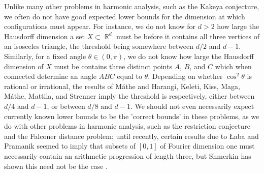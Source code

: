 \documentclass[11pt]{article}
\DeclareMathOperator{\QQ}{\mathbb{Q}}
\DeclareMathOperator{\RR}{\mathbb{R}}
\begin{document}
Unlike many other problems in harmonic analysis, such as the Kakeya conjecture, we often do not have good expected lower bounds for the dimension at which configurations must appear.
%
For instance, we do not know for $d > 2$ how large the Hausdorff dimension a set $X \subset \RR^d$ must be before it contains all three vertices of an isosceles triangle, the threshold being somewhere between $d/2$ and $d-1$. Similarly, for a fixed angle $\theta \in (0,\pi)$, we do not know how large the Hausdorff dimension of $X$ must be contains three distinct points $A$, $B$, and $C$ which when connected determine an angle $ABC$ equal to $\theta$. Depending on whether $\cos^2 \theta$ is rational or irrational, the results of M\'{a}the \cite{Mathe} and Harangi, Keleti, Kiss, Maga, M\'{a}the, Mattila, and Strenner \cite{Harangi} imply the threshold is respectively, either between $d/4$ and $d-1$, or between $d/8$ and $d-1$. 
We should not even necessarily expect currently known lower bounds to be the 'correct bounds' in these problems, as we do with other problems in harmonic analysis, such as the restriction conjecture and the Falconer distance problem; until recently, certain results due to {\L}aba and Pramanik \cite{LabaPramanik} seemed to imply that subsets of $[0,1]$ of Fourier dimension one must necessarily contain an arithmetic progression of length three, but Shmerkin has shown this need not be the case \cite{Shmerkin}.
\end{document}
